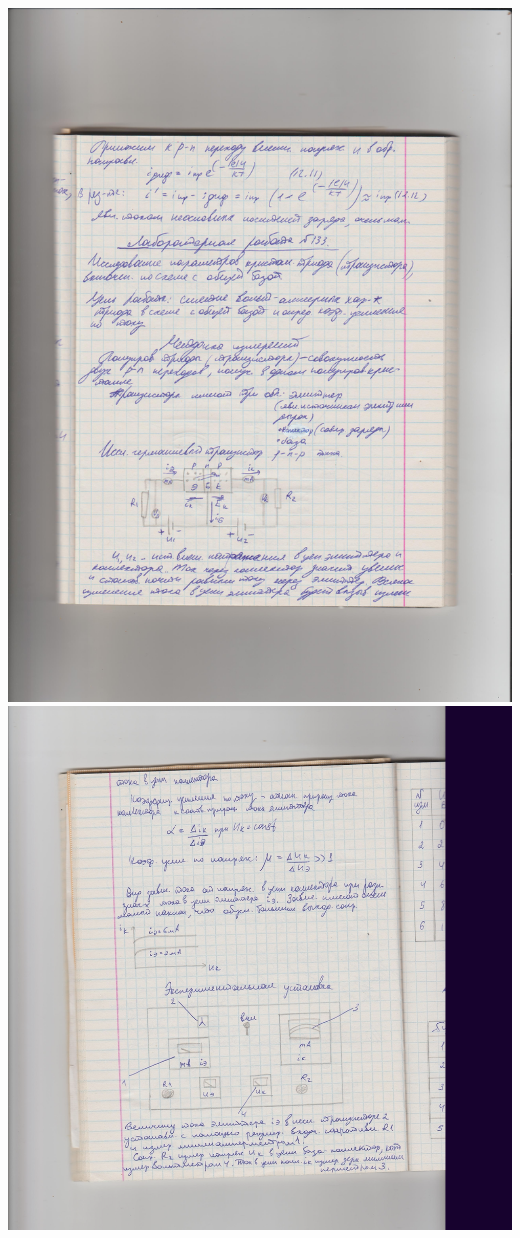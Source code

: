 \documentclass[12pt]{article}
\begin{document}
\includegraphics {133_4.jpeg}\\
\includegraphics {133_5_1.jpeg}\\
\end{document}
